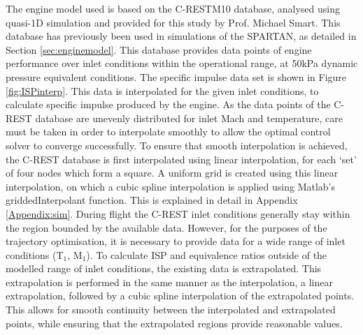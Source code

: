  The engine model used is based on the C-RESTM10 database\cite{Preller2017b,Preller2018a}, analysed using quasi-1D simulation and provided for this study by Prof. Michael Smart. This database has previously been used in simulations of the SPARTAN, as detailed in Section \ref{sec:enginemodel}.
This database provides data points of engine performance over inlet conditions within the operational range, at 50kPa dynamic pressure equivalent conditions. The specific impulse data set is shown in Figure \ref{fig:ISPinterp}. This data is interpolated for the given inlet conditions, to calculate specific impulse produced by the engine. As the data points of the C-REST database are unevenly distributed for inlet Mach and temperature, care must be taken in order to interpolate smoothly to allow the optimal control solver to converge successfully. To ensure that smooth interpolation is achieved, the C-REST database is first interpolated using linear interpolation, for each `set' of four nodes which form a square. A uniform grid is created using this linear interpolation, on which a cubic spline interpolation is applied using Matlab's \textsf{griddedInterpolant} function. This is explained in detail in Appendix \ref{Appendix:sim}. During flight the C-REST inlet conditions generally stay within the region bounded by the available data. However, for the purposes of the trajectory optimisation, it is necessary to provide data for a wide range of inlet conditions (T$_1$, M$_1$). To calculate ISP and equivalence ratios outside of the modelled range of inlet conditions, the existing data is extrapolated. This extrapolation is performed in the same manner as the interpolation, a linear extrapolation, followed by a cubic spline interpolation of the extrapolated points. This allows for smooth continuity between the interpolated and extrapolated points, while ensuring that the extrapolated regions provide reasonable values. 

